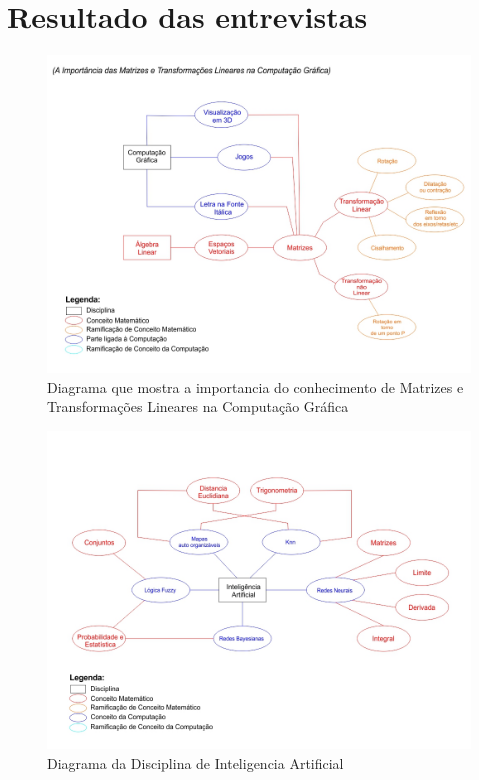 \documentclass[12pt,a4paper]{article}
\begin{document}
\section{Resultado das entrevistas}

\begin{figure}[!h]
\centering
\includegraphics[scale=0.4]{imagens/DiagramaEXTRA.jpg} 
\caption{Diagrama que mostra a importancia do conhecimento de Matrizes e Transformações Lineares na Computação Gráfica}
\end{figure}

\begin{figure}[!h]
\centering
\includegraphics[scale=0.4]{imagens/Diagrama Inteligencia Artificial.jpg} 
\caption{Diagrama da Disciplina de Inteligencia Artificial}
\end{figure}
\end{document}

